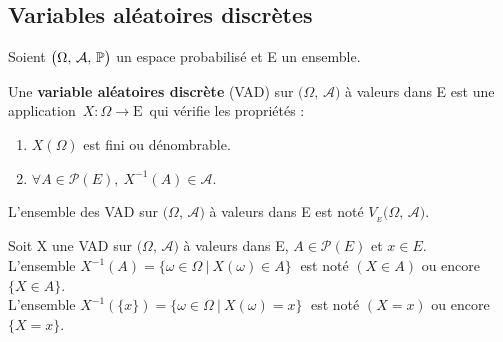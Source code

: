 \vspace{1cm}

\subsection{Variables aléatoires discrètes}
\vspace{0.5cm}
\begin{center}
    Soient \(\bigl(\Omega,\,\mathcal{A},\,\mathbb{P}\bigr)\) un espace probabilisé et E un ensemble.
\end{center}

\vspace{0.5cm}

Une \textbf{variable aléatoires discrète} (VAD) sur \(\bigl(\Omega,\,\mathcal{A}\bigr)\) à valeurs dans E est une application \(\,X:\Omega \to \text{E}\,\) qui vérifie les propriétés :\vspace{0.1cm}
\begin{enumerate}[leftmargin=2cm]
    \item \(X(\Omega)\) est fini ou dénombrable.
    
    \item \(\forall A\in \mathcal{P}(E),\ X^{-1}(A)\in \mathcal{A}.\)
\end{enumerate}
\vspace{0.2cm}
\begin{small}
    \noindent L'ensemble des VAD sur \(\bigl(\Omega,\,\mathcal{A}\bigr)\) à valeurs dans E est noté \(V_{_E}\bigl(\Omega,\,\mathcal{A}\bigr).\)
\end{small}

\newpage

Soit X une VAD sur \(\bigl(\Omega,\,\mathcal{A}\bigr)\) à valeurs dans E, \(A\in \mathcal{P}(E)\) et \(x\in E\).\vspace{0.1cm}\\
L'ensemble \(X^{-1}(A)=\{\omega\in \Omega \ \rvert \ X(\omega)\in A\}\;\) est noté \((X\in A)\) ou encore \(\{X\in A\}\).\vspace{0.1cm}\\
L'ensemble \(X^{-1}(\{x\})=\{\omega\in \Omega \ \rvert \ X(\omega)=x\}\;\) est noté \((X=x)\) ou encore \(\{X=x\}\).\\

